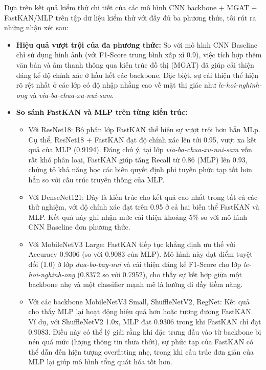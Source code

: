 \indent Dựa trên kết quả kiểm thử chi tiết của các mô hình CNN backbone + MGAT + FastKAN/MLP trên tập dữ liệu kiểm thử với đầy đủ ba phương thức, tôi rút ra những nhận xét sau:\vspace{-0.1cm}
\begin{itemize}[label={--}, itemsep=1pt]
    \item \textbf{Hiệu quả vượt trội của đa phương thức:} So với mô hình CNN Baseline chỉ sử dụng hình ảnh (với F1-Score trung bình xấp xỉ 0.9), việc tích hợp thêm văn bản và âm thanh thông qua kiến trúc đồ thị (MGAT) đã giúp cải thiện đáng kể độ chính xác ở hầu hết các backbone. Đặc biệt, sự cải thiện thể hiện rõ rệt nhất ở các lớp có độ nhập nhằng cao về mặt thị giác như \textit{le-hoi-nghinh-ong} và \textit{via-ba-chua-xu-nui-sam}.
    \item \textbf{So sánh FastKAN và MLP trên từng kiến trúc:}\vspace{-0.1cm}
    \begin{itemize}[label={+}, itemsep=1pt]
        \item Với ResNet18: Bộ phân lớp FastKAN thể hiện sự vượt trội hơn hẳn MLp. Cụ thể, ResNet18 + FastKAN đạt độ chính xác lên tới 0.95, vượt xa kết quả của MLP (0.9194). Đáng chú ý, tại lớp \textit{via-ba-chua-xu-nui-sam} vốn rất khó phân loại, FastKAN giúp tăng Recall từ 0.86 (MLP) lên 0.93, chứng tỏ khả năng học các biên quyết định phi tuyến phức tạp tốt hơn hẳn so với cấu trúc truyền thống của MLP.
        \item Với DenseNet121: Đây là kiến trúc cho kết quả cao nhất trong tất cả các thử nghiệm, với độ chính xác đạt trên 0.95 ở cả hai biến thể FastKAN và MLP. Kết quả này ghi nhận mức cải thiện khoảng 5\% so với mô hình CNN Baseline đơn phương thức.
        \item Với MobileNetV3 Large: FastKAN tiếp tục khẳng định ưu thế với Accuracy 0.9306 (so với 0.9083 của MLP). Mô hình này đạt điểm tuyệt đối (1.0) ở lớp \textit{dua-bo-bay-nui} và cải thiện đáng kể F1-Score cho lớp \textit{le-hoi-nghinh-ong} (0.8372 so với 0.7952), cho thấy sự kết hợp giữa một backbone nhẹ và một classifier mạnh mẽ là hướng đi đầy tiềm năng.
        \item Với các backbone MobileNetV3 Small, ShuffleNetV2, RegNet: Kết quả cho thấy MLP lại hoạt động hiệu quả hơn hoặc tương đương FastKAN. Ví dụ, với ShuffleNetV2 1.0x, MLP đạt 0.9306 trong khi FastKAN chỉ đạt 0.9083. Điều này có thể lý giải rằng khi đặc trưng đầu vào từ backbone bị nén quá mức (lượng thông tin thưa thớt), sự phức tạp của FastKAN có thể dẫn đến hiện tượng overfitting nhẹ, trong khi cấu trúc đơn giản của MLP lại giúp mô hình tổng quát hóa tốt hơn.
    \end{itemize}
\end{itemize}



